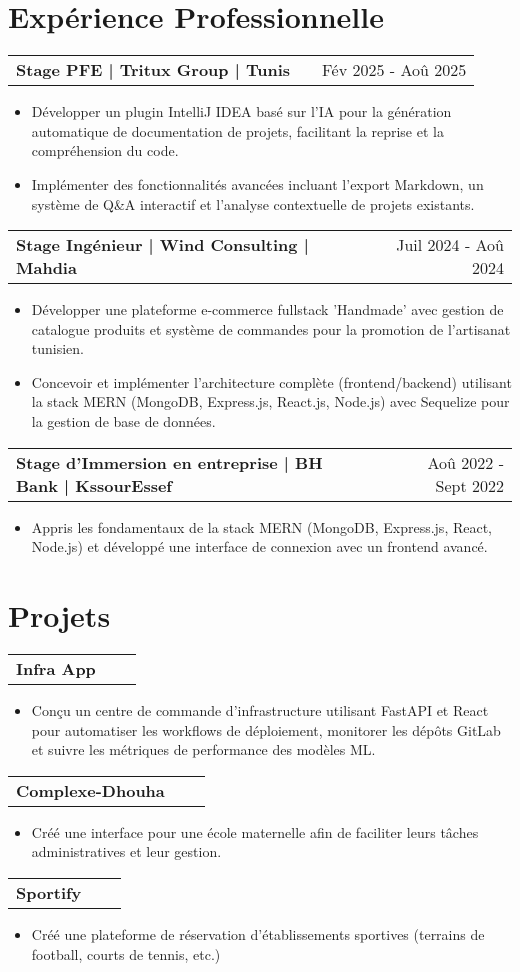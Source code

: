 \documentclass[a4paper,11pt]{article}
\makeatletter
\newenvironment{jobshort}[2]
    {
    \begin{tabularx}{\linewidth}{@{}l X r@{}}
    \textbf{#1} & \hfill &  #2 \\[2.75pt]
    \end{tabularx}
    \begin{minipage}[t]{\linewidth}
    \begin{itemize}[nosep,after=\strut, leftmargin=1em, itemsep=2pt]
    }
    {
    \end{itemize}
    \end{minipage}
    }
\makeatother
\begin{document}
\section{Expérience Professionnelle}

\begin{jobshort}{Stage PFE | Tritux Group | Tunis}{Fév 2025 - Aoû 2025}
\item Développer un plugin IntelliJ IDEA basé sur l'IA pour la génération automatique de documentation de projets, facilitant la reprise et la compréhension du code.
\item Implémenter des fonctionnalités avancées incluant l'export Markdown, un système de Q\&A interactif et l'analyse contextuelle de projets existants.
\end{jobshort}

\begin{jobshort}{Stage Ingénieur | Wind Consulting | Mahdia}{Juil 2024 - Aoû 2024}
\item Développer une plateforme e-commerce fullstack 'Handmade' avec gestion de catalogue produits et système de commandes pour la promotion de l'artisanat tunisien.
\item Concevoir et implémenter l'architecture complète (frontend/backend) utilisant la stack MERN (MongoDB, Express.js, React.js, Node.js) avec Sequelize pour la gestion de base de données.
\end{jobshort}

\begin{jobshort}{Stage d'Immersion en entreprise | BH Bank | KssourEssef }{Aoû 2022 - Sept 2022}
\item Appris les fondamentaux de la stack MERN (MongoDB, Express.js, React, Node.js) et développé une interface de connexion avec un frontend avancé.
\end{jobshort}


  
\section{Projets}

\begin{jobshort}{Infra App}{}
\item Conçu un centre de commande d'infrastructure utilisant FastAPI et React pour automatiser les workflows de déploiement, monitorer les dépôts GitLab et suivre les métriques de performance des modèles ML.
\end{jobshort}
\vspace{-1pt}
\begin{jobshort}{Complexe-Dhouha}{}
\item Créé une interface pour une école maternelle afin de faciliter leurs tâches administratives et leur gestion.
\end{jobshort}
\vspace{-1pt}
\begin{jobshort}{Sportify}{}
\item Créé une plateforme de réservation d'établissements sportives (terrains de football, courts de tennis, etc.)
\end{jobshort}
\end{document}
